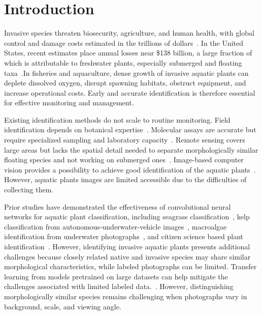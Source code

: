 \documentclass[final,3p,times,twocolumn]{elsarticle}
\begin{document}
\section{Introduction}
\label{sec:intro}

Invasive species threaten biosecurity, agriculture, and human health, with global control and damage costs estimated in the trillions of dollars~\citep{tasker2024nuanced, macedo2024economic, shen2024typical, vaissiere2022nature, cuthbert2021global}. In the United States, recent estimates place annual losses near \$138 billion, a large fraction of which is attributable to freshwater plants, especially submerged and floating taxa~\citep{pimentel2000environmental, lovell2006economic, warziniack2021economics, macedo2024economic}.In fisheries and aquaculture, dense growth of invasive aquatic plants can deplete dissolved oxygen, disrupt spawning habitats, obstruct equipment, and increase operational costs. Early and accurate identification is therefore essential for effective monitoring and management.

Existing identification methods do not scale to routine monitoring. Field identification depends on botanical expertise~\citep{dehez2023investigation}. Molecular assays are accurate but require specialized sampling and laboratory capacity~\citep{angles2019detection, ghahramanzadeh2013efficient, scriver2015development}. Remote sensing covers large areas but lacks the spatial detail needed to separate morphologically similar floating species and not working on submerged ones~\citep{brooks2019implementing, unitis2018remote, jochems4883509active}. Image-based computer vision provides a possibility to achieve good identification of the aquatic plants~\citep{wang2026realtime}. However, aquatic plants images are limited accessible due to the difficulties of collecting them. 

Prior studies have demonstrated the effectiveness of convolutional neural networks for aquatic plant classification, including seagrass classification~\citep{DeepSeaGrass1, Nawaz2025Seagrass, Paul2023LWDS, baos_cnn}, kelp classification from autonomous-underwater-vehicle images~\citep{mahmood2020kelp}, macroalgae identification from underwater photographs~\citep{sonmez2026macroalgae}, and citizen science based plant identification~\citep{joly2016plantnet}. However, identifying invasive aquatic plants presents additional challenges because closely related native and invasive species may share similar morphological characteristics, while labeled photographs can be limited. Transfer learning from models pretrained on large datasets can help mitigate the challenges associated with limited labeled data.~\citep{Kelps_SVMs}. However, distinguishing morphologically similar species remains challenging when photographs vary in background, scale, and viewing angle.
\end{document}
